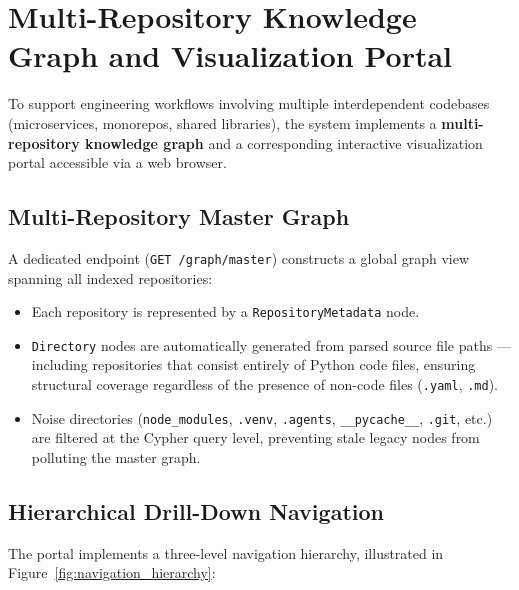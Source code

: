 \documentclass[12pt,letterpaper,oneside]{report}
\begin{document}
\section{Multi-Repository Knowledge Graph and Visualization Portal}
\label{sec:visualization}
To support engineering workflows involving multiple interdependent codebases (microservices, monorepos, shared libraries), the system implements a \textbf{multi-repository knowledge graph} and a corresponding interactive visualization portal accessible via a web browser.

\subsection{Multi-Repository Master Graph}
A dedicated endpoint (\texttt{GET /graph/master}) constructs a global graph view spanning all indexed repositories:
\begin{itemize}
    \item Each repository is represented by a \texttt{RepositoryMetadata} node.
    \item \texttt{Directory} nodes are automatically generated from parsed source file paths --- including repositories that consist entirely of Python code files, ensuring structural coverage regardless of the presence of non-code files (\texttt{.yaml}, \texttt{.md}).
    \item Noise directories (\texttt{node\_modules}, \texttt{.venv}, \texttt{.agents}, \texttt{\_\_pycache\_\_}, \texttt{.git}, etc.) are filtered at the Cypher query level, preventing stale legacy nodes from polluting the master graph.
\end{itemize}

\subsection{Hierarchical Drill-Down Navigation}
The portal implements a three-level navigation hierarchy, illustrated in Figure~\ref{fig:navigation_hierarchy}:
\end{document}
